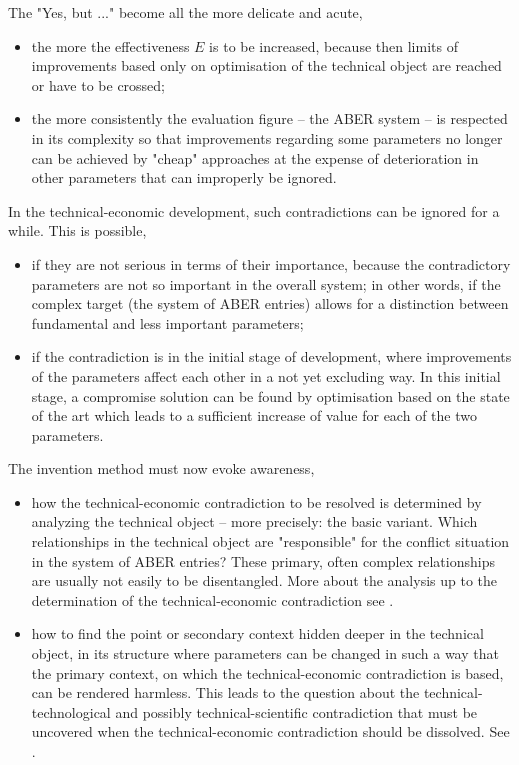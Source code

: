\documentclass[11pt,a4paper]{article}
\begin{document}
The "Yes, but ..." become all the more delicate and acute, 
\begin{itemize}
\item the more the effectiveness $E$ is to be increased, because then limits
  of improvements based only on optimisation of the technical object are
  reached or have to be crossed;
\item the more consistently the evaluation figure -- the ABER system -- is
  respected in its complexity so that improvements regarding some parameters
  no longer can be achieved by "cheap" approaches at the expense of
  deterioration in other parameters that can improperly be ignored.
\end{itemize}

In the technical-economic development, such contradictions can be ignored for
a while. This is possible,
\begin{itemize}
\item if they are not serious in terms of their importance, because the
  contradictory parameters are not so important in the overall system; in
  other words, if the complex target (the system of ABER entries) allows for a
  distinction between fundamental and less important parameters;
\item if the contradiction is in the initial stage of development, where
  improvements of the parameters affect each other in a not yet excluding way.
  In this initial stage, a compromise solution can be found by optimisation
  based on the state of the art which leads to a sufficient increase of value
  for each of the two parameters.
\end{itemize}

The invention method must now evoke awareness,
\begin{itemize}
\item how the technical-economic contradiction to be resolved is determined by
  analyzing the technical object -- more precisely: the basic variant.  Which
  relationships in the technical object are "responsible" for the conflict
  situation in the system of ABER entries?  These primary, often complex
  relationships are usually not easily to be disentangled. More about the
  analysis up to the determination of the technical-economic contradiction see
  \cite[A.1--A.4]{RM-21}.
\item how to find the point or secondary context hidden deeper in the
  technical object, in its structure where parameters can be changed in such a
  way that the primary context, on which the technical-economic contradiction
  is based, can be rendered harmless. This leads to the question about the
  technical-technological and possibly technical-scientific contradiction that
  must be uncovered when the technical-economic contradiction should be
  dissolved.  See \cite[A.5--A.9]{RM-21}.
\end{itemize}
\end{document}
